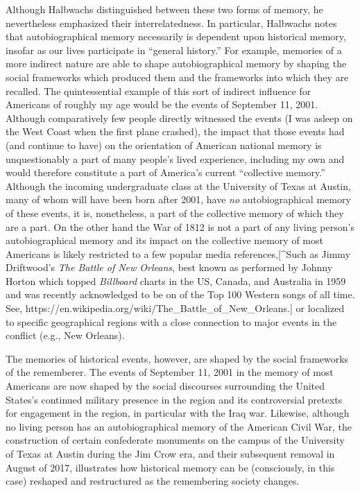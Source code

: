 Although Halbwachs distinguished between these two forms of memory, he
nevertheless emphasized their interrelatedness. In particular, Halbwachs
notes that autobiographical memory necessarily is dependent upon
historical memory, insofar as our lives participate in ``general
history.''\autocite[52]{halbwachs1980} For example, memories of a more
indirect nature are able to shape autobiographical memory by shaping the
social frameworks which produced them and the frameworks into which they
are recalled. The quintessential example of this sort of indirect
influence for Americans of roughly my age would be the events of
September 11, 2001. Although comparatively few people directly witnessed
the events (I was asleep on the West Coast when the first plane
crashed), the impact that those events had (and continue to have) on the
orientation of American national memory is unquestionably a part of many
people's lived experience, including my own and would therefore
constitute a part of America's current ``collective memory.'' Although
the incoming undergraduate class at the University of Texas at Austin,
many of whom will have been born after 2001, have \emph{no}
autobiographical memory of these events, it is, nonetheless, a part of
the collective memory of which they are a part. On the other hand the
War of 1812 is not a part of any living person's autobiographical memory
and its impact on the collective memory of most Americans is likely
restricted to a few popular media references,{[}\^{}Such as Jimmy
Driftwood's \emph{The Battle of New Orleans}, best known as performed by
Johnny Horton which topped \emph{Billboard} charts in the US, Canada,
and Australia in 1959 and was recently acknowledged to be on of the Top
100 Western songs of all time. See,
https://en.wikipedia.org/wiki/The\_Battle\_of\_New\_Orleans.{]} or
localized to specific geographical regions with a close connection to
major events in the conflict (e.g., New Orleans).

The memories of historical events, however, are shaped by the social
frameworks of the rememberer. The events of September 11, 2001 in the
memory of most Americans are now shaped by the social discourses
surrounding the United States's continued military presence in the
region and its controversial pretexts for engagement in the region, in
particular with the Iraq war. Likewise, although no living person has an
autobiographical memory of the American Civil War, the construction of
certain confederate monuments on the campus of the University of Texas
at Austin during the Jim Crow era, and their subsequent removal in
August of 2017, illustrates how historical memory can be (consciously,
in this case) reshaped and restructured as the remembering society
changes.

